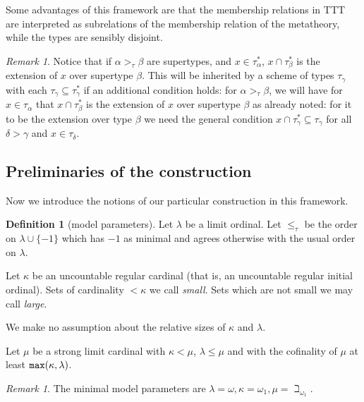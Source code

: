 \documentclass{article}
\theoremstyle{definition}
\newtheorem{definition}[theorem]{Definition}
\theoremstyle{remark}
\newtheorem{remark}[theorem]{Remark}
\begin{document}
Some advantages of this framework are that the membership relations in TTT are interpreted as subrelations of the membership relation of the metatheory, while the types are sensibly disjoint.

\begin{remark}
Notice that if $\alpha>_\tau \beta$ are supertypes, and $x \in \tau^*_\alpha$, $x \cap \tau^*_\beta$ is the extension of $x$ over supertype $\beta$.  This will be inherited by a scheme of types $\tau_\gamma$ with each $\tau_\gamma \subseteq \tau^*_\gamma$ if an additional condition holds:  for $\alpha>_\tau\beta$, we will have
for $x \in \tau_\alpha$ that $x \cap \tau^*_\beta$ is the extension of $x$ over supertype $\beta$ as already noted:  for it to be the extension over type $\beta$ we need the general condition $x \cap \tau^*_\gamma \subseteq \tau_\gamma$ for all $\delta>\gamma$ and $x \in \tau_\delta$.
\end{remark}

\subsection{Preliminaries of the construction}
\label{ss:preliminaries}

Now we introduce the notions of our particular construction in this framework.
\begin{definition}[model parameters]\label{def:model_params}
Let $\lambda$ be a limit ordinal.  Let $\leq_\tau$ be the order on $\lambda \cup \{-1\}$ which has $-1$ as minimal and agrees otherwise with the usual order on $\lambda$.

Let $\kappa$ be an uncountable regular cardinal (that is, an uncountable  regular initial ordinal).  Sets of cardinality $<\kappa$ we call {\em small\/}.  Sets which are not small we may call {\em large\/}.

We make no assumption about the relative sizes of $\kappa$ and $\lambda$.

Let $\mu$ be a strong limit cardinal with $\kappa<\mu$, $\lambda \leq \mu$ and with the cofinality of $\mu$ at least ${\tt max}(\kappa,\lambda)$.
\end{definition}
\begin{remark}\label{rk:example_model_params}
{The minimal model parameters are $\lambda = \omega, \kappa = \omega_1, \mu = \beth_{\omega_1}$.}
\end{remark}
\end{document}
